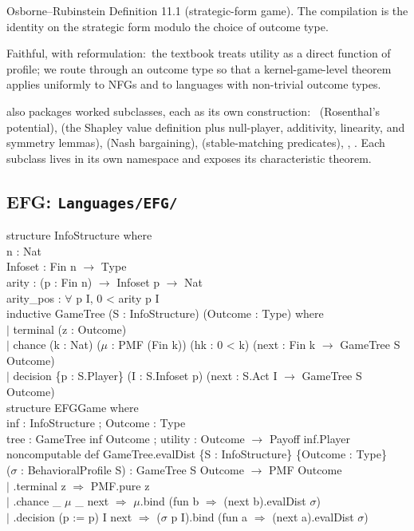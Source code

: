 \Textbook
Osborne–Rubinstein Definition 11.1 (strategic-form game).  The
compilation is the identity on the strategic form modulo the
choice of outcome type.

\Faithfulness
Faithful, with reformulation:\ the textbook treats utility as a
direct function of profile; we route through an outcome type so
that a kernel-game-level theorem applies uniformly to NFGs and to
languages with non-trivial outcome types.

\Variants
{} also packages worked subclasses, each as its
own  construction:\ 
(Rosenthal's potential),  (the Shapley
value definition plus null-player, additivity, linearity, and
symmetry lemmas),
 (Nash bargaining), 
(stable-matching predicates), ,
.  Each subclass lives in its own namespace
and exposes its characteristic theorem.

\subsection{EFG: \texttt{Languages/EFG/}}
\label{sec:supp:efg}\label{def:EFG.InfoStructure}\label{def:EFG.GameTree}\label{def:EFG.EFGGame}\label{def:EFG.evalDist}

\begin{leanbox}
structure InfoStructure where\\
\bd n        : Nat\\
\bd Infoset  : Fin n $\to$ Type\\
\bd arity    : (p : Fin n) $\to$ Infoset p $\to$ Nat\\
\bd arity\_pos : $\forall$ p I, 0 < arity p I\\[3pt]
inductive GameTree (S : InfoStructure) (Outcome : Type) where\\
\bd $\mid$ terminal (z : Outcome)\\
\bd $\mid$ chance (k : Nat) ($\mu$ : PMF (Fin k)) (hk : 0 < k) (next : Fin k $\to$ GameTree S Outcome)\\
\bd $\mid$ decision \{p : S.Player\} (I : S.Infoset p) (next : S.Act I $\to$ GameTree S Outcome)\\[3pt]
structure EFGGame where\\
\bd inf : InfoStructure ; Outcome : Type\\
\bd tree : GameTree inf Outcome ; utility : Outcome $\to$ Payoff inf.Player\\[3pt]
noncomputable def GameTree.evalDist \{S : InfoStructure\} \{Outcome : Type\}\\
\bd ($\sigma$ : BehavioralProfile S) : GameTree S Outcome $\to$ PMF Outcome\\
\bd $\mid$ .terminal z $\Rightarrow$ PMF.pure z\\
\bd $\mid$ .chance \_ $\mu$ \_ next $\Rightarrow$ $\mu$.bind (fun b $\Rightarrow$ (next b).evalDist $\sigma$)\\
\bd $\mid$ .decision (p := p) I next $\Rightarrow$ ($\sigma$ p I).bind (fun a $\Rightarrow$ (next a).evalDist $\sigma$)
\end{leanbox}

